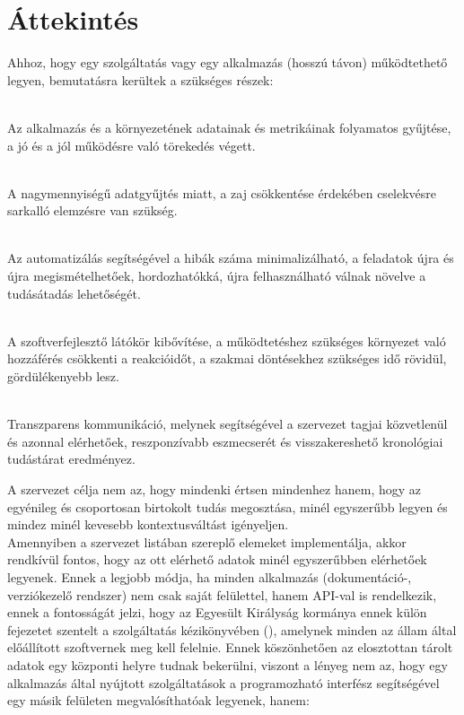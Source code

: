 
\section{Áttekintés}
\label{sect:futureops_overview}
Ahhoz, hogy egy szolgáltatás vagy egy alkalmazás (hosszú távon) működtethető legyen, bemutatásra kerültek a szükséges részek:

\begin{description}
  \label{dsc:important_stuffs}
  \item[Folyamatos adatgyűjtés és értesítés]\hfill\\
  Az alkalmazás és a környezetének adatainak és metrikáinak folyamatos gyűjtése, a jó és a jól működésre való törekedés végett.
  \item[Gyűjtött adatok elemzése]\hfill\\
  A nagymennyiségű adatgyűjtés miatt, a zaj csökkentése érdekében cselekvésre sarkalló elemzésre van szükség.
  \item[Automatizált folyamatok]\hfill\\
  Az automatizálás segítségével a hibák száma minimalizálható, a feladatok újra és újra megismételhetőek, hordozhatókká, újra felhasználható válnak növelve a tudásátadás lehetőségét.
  \item[A rendszerek közti kapcsolatok megértése]\hfill\\
  A szoftverfejlesztő látókör kibővítése, a működtetéshez szükséges környezet való hozzáférés csökkenti a reakcióidőt, a szakmai döntésekhez szükséges idő rövidül, gördülékenyebb lesz.
  \item[Transzparens kommunikáció]\hfill\\
  Transzparens kommunikáció, melynek segítségével a szervezet tagjai közvetlenül és azonnal elérhetőek, reszponzívabb eszmecserét és visszakereshető kronológiai tudástárat eredményez.
\end{description}

{\Large A szervezet célja nem az, hogy mindenki értsen mindenhez hanem, hogy az egyénileg és csoportosan birtokolt tudás megosztása, minél egyszerűbb legyen és mindez minél kevesebb kontextusváltást igényeljen.}
\hfill\\
Amennyiben a szervezet  listában szereplő elemeket implementálja, akkor rendkívül fontos, hogy az ott elérhető adatok minél egyszerűbben elérhetőek legyenek. Ennek a legjobb módja, ha minden alkalmazás (dokumentáció-, verziókezelő rendszer) nem csak saját felülettel, hanem API-val is rendelkezik, ennek a fontosságát jelzi, hogy az Egyesült Királyság kormánya ennek külön fejezetet szentelt a szolgáltatás kézikönyvében (\cite{uk_gov_build_api}), amelynek minden az állam által előállított szoftvernek meg kell felelnie. Ennek köszönhetően az elosztottan tárolt adatok egy központi helyre tudnak bekerülni, viszont a lényeg nem az, hogy egy alkalmazás által nyújtott szolgáltatások a programozható interfész segítségével egy másik felületen megvalósíthatóak legyenek, hanem:

